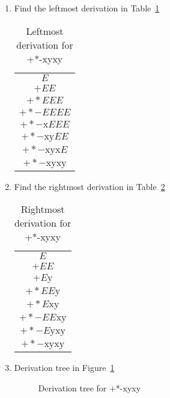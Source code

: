 \documentclass[12pt,a4paper,twoside]{article}  %
\begin{document}
\begin{enumerate}

\item Find the leftmost derivation in Table~\ref{5.4.7.a-1}
\begin{table}
\begin{tabular}{c}
$E$ \\
$+EE$ \\
$+*EEE$ \\
$+*-EEEE$ \\
$+*-\textrm{x}EEE$ \\
$+*-\textrm{xy}EE$ \\
$+*-\textrm{xyx}E$ \\
$+*-\textrm{xyxy}$
\end{tabular}
\caption{Leftmost derivation for +*-xyxy}\label{5.4.7.a-1}
\end{table}

\item Find the rightmost derivation in Table~\ref{5.4.7.a-2}
\begin{table}
\begin{tabular}{c}
$E$ \\
$+EE$ \\
$+E\textrm{y}$ \\
$+*EE\textrm{y}$ \\
$+*E\textrm{xy}$ \\
$+*-EE\textrm{xy}$ \\
$+*-E\textrm{yxy}$ \\
$+*-\textrm{xyxy}$
\end{tabular}
\caption{Rightmost derivation for +*-xyxy}\label{5.4.7.a-2}
\end{table}

\item Derivation tree in Figure~\ref{5.4.7.a-3}

\begin{figure}

\caption{Derivation tree for +*-xyxy}\label{5.4.7.a-3}
\end{figure}

\end{enumerate}
\end{document}
